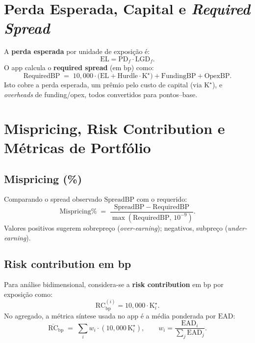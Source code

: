 \documentclass[11pt,a4paper]{article}
\newcommand{\PD}{\mathrm{PD}}
\newcommand{\LGD}{\mathrm{LGD}}
\newcommand{\EAD}{\mathrm{EAD}}
\newcommand{\EL}{\mathrm{EL}}
\newcommand{\Kcap}{\mathrm{K}}
\newcommand{\bp}{\mathrm{bp}}
\begin{document}
\section{Perda Esperada, Capital e \emph{Required Spread}}
A \textbf{perda esperada} por unidade de exposição é:
\begin{equation}
\EL = \PD_f \cdot \LGD_f.
\end{equation}
O app calcula o \textbf{required spread} (em \(\bp\)) como:
\begin{equation}
\mathrm{RequiredBP} \;=\; 10{,}000 \cdot \Big(\EL + \text{Hurdle}\cdot \Kcap^\star\Big) + \mathrm{FundingBP} + \mathrm{OpexBP}.
\label{eq:reqbp}
\end{equation}
Isto cobre a perda esperada, um prêmio pelo custo de capital (via \(\Kcap^\star\)), e \emph{overheads} de funding/opex, todos convertidos para pontos--base.

\section{Mispricing, Risk Contribution e Métricas de Portfólio}
\subsection{Mispricing (\%)}
Comparando o spread observado \(\mathrm{SpreadBP}\) com o requerido:
\begin{equation}
\mathrm{Mispricing\%} \;=\; \frac{\mathrm{SpreadBP} - \mathrm{RequiredBP}}{\max(\mathrm{RequiredBP},\,10^{-9})}.
\end{equation}
Valores positivos sugerem sobrepreço (\emph{over-earning}); negativos, subpreço (\emph{under-earning}).

\subsection{Risk contribution em bp}
Para análise bidimensional, considera-se a \textbf{risk contribution} em bp por exposição como:
\begin{equation}
\mathrm{RC}_{\bp}^{(i)} = 10{,}000 \cdot \Kcap_i^\star.
\end{equation}
No agregado, a métrica síntese usada no app é a média ponderada por \(\EAD\):
\begin{equation}
\overline{\mathrm{RC}}_{\bp} \;=\; \sum_i w_i \cdot (10{,}000\,\Kcap_i^\star), \qquad
w_i = \frac{\EAD_i}{\sum_j \EAD_j}.
\end{equation}
\end{document}
